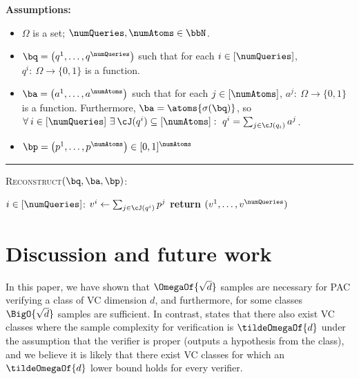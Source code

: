 \documentclass[11pt]{article}
\begin{document}
\begin{protocol}[H]
	\begin{ShadedAlgorithmBox}
		{\bfseries Assumptions:}
		\begin{itemize}
			\item{$\Omega$ is a set; $\numQueries,\numAtoms \in \bbN$.}
			\item{
				$\bq = \left(q^1,\dots,q^{\numQueries}\right)$ such that for each $i \in [\numQueries]$, $q^i:\: \Omega \to \{0,1\}$ is a function.
			}
			\item{
				$\ba = \left(a^1,\dots,a^{\numAtoms}\right)$ such that for each $j \in [\numAtoms]$, $a^j:\: \Omega \to \{0,1\}$ is a function. Furthermore,
				$\ba = \atoms{\sigma(\bq)}$, so $\forall \: i \in [\numQueries]~ \exists \: \cJ(q^i) \subseteq [\numAtoms]: ~ q^i = \sum_{j \in \cJ(q_i)} a^j$.
			}
			\item{
				$\bp = \left(p^1,\dots,p^{\numAtoms}\right) \in [0,1]^{\numAtoms}$
			}
		\end{itemize}
		
		\noindent\rule{\textwidth}{0.5pt}
		
		\vspace*{0.5em}
		
		\textsc{Reconstruct}$(\bq,\ba,\bp)$:
		\begin{algorithmic}
			\For $i \in [\numQueries]$:
				\State $v^i \gets \sum_{j \in \cJ(q^i)} p^j$
			\EndFor
			\State \textbf{return} $(v^1,\dots,v^{\numQueries})$
		\end{algorithmic}
		
	\end{ShadedAlgorithmBox}
	\caption{A subroutine of \cref{protocol:sq-verifier-iteration}. Compute the evaluations for a collection of statistical queries $\bq$ with atoms $\ba$ given evaluations $\bp$ for the atoms.}
	\label{protocol:sq-reconstruct-valuations}
\end{protocol}

\section{Discussion and future work}

In this paper, we have shown that $\OmegaOf{\sqrt{d}}$ samples are necessary for PAC verifying a class of VC dimension $d$, and furthermore, for some classes $\BigO{\sqrt{d}}$ samples are sufficient. In contrast, %
\cite[Lemma 4.1]{GoldwasserRSY21}  %
states that there also exist VC classes where the sample complexity for verification
is $\tildeOmegaOf{d}$ under the assumption that the verifier is proper (outputs a hypothesis from the class), and we believe it is likely that there exist VC classes for which an $\tildeOmegaOf{d}$ lower bound holds for every verifier. 
\end{document}
